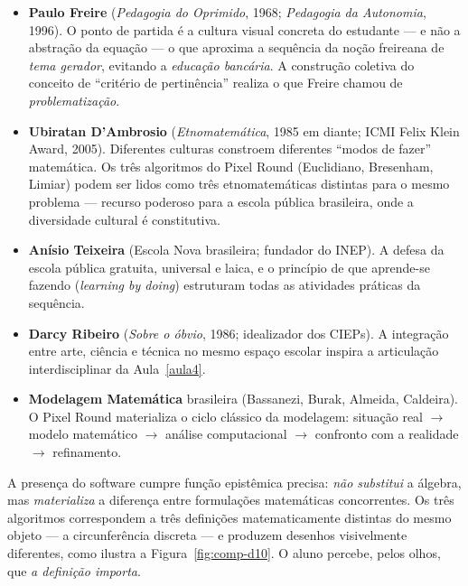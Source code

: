 \documentclass[12pt,a4paper]{scrartcl}
\newcommand{\acc}[1]{\textcolor{accent}{\textbf{#1}}}
\begin{document}
\begin{itemize}[leftmargin=1.3em,itemsep=0.2em,topsep=0.3em]
  \item \acc{Paulo Freire} (\emph{Pedagogia do Oprimido}, 1968; \emph{Pedagogia da Autonomia}, 1996). O ponto de partida é a cultura visual concreta do estudante --- e não a abstração da equação --- o que aproxima a sequência da noção freireana de \emph{tema gerador}, evitando a \emph{educação bancária}. A construção coletiva do conceito de ``critério de pertinência'' realiza o que Freire chamou de \emph{problematização}.

  \item \acc{Ubiratan D'Ambrosio} (\emph{Etnomatemática}, 1985 em diante; ICMI Felix Klein Award, 2005). Diferentes culturas constroem diferentes ``modos de fazer'' matemática. Os três algoritmos do Pixel Round (Euclidiano, Bresenham, Limiar) podem ser lidos como três etnomatemáticas distintas para o mesmo problema --- recurso poderoso para a escola pública brasileira, onde a diversidade cultural é constitutiva.

  \item \acc{Anísio Teixeira} (Escola Nova brasileira; fundador do INEP). A defesa da escola pública gratuita, universal e laica, e o princípio de que aprende-se fazendo (\emph{learning by doing}) estruturam todas as atividades práticas da sequência.

  \item \acc{Darcy Ribeiro} (\emph{Sobre o óbvio}, 1986; idealizador dos CIEPs). A integração entre arte, ciência e técnica no mesmo espaço escolar inspira a articulação interdisciplinar da Aula~\ref{aula4}.

  \item \acc{Modelagem Matemática} brasileira (Bassanezi, Burak, Almeida, Caldeira). O Pixel Round materializa o ciclo clássico da modelagem: situação real $\rightarrow$ modelo matemático $\rightarrow$ análise computacional $\rightarrow$ confronto com a realidade $\rightarrow$ refinamento.
\end{itemize}

A presença do software cumpre função epistêmica precisa: \emph{não substitui} a álgebra, mas \emph{materializa} a diferença entre formulações matemáticas concorrentes. Os três algoritmos correspondem a três definições matematicamente distintas do mesmo objeto --- a circunferência discreta --- e produzem desenhos visivelmente diferentes, como ilustra a Figura~\ref{fig:comp-d10}. O aluno percebe, pelos olhos, que \emph{a definição importa}.
\end{document}
